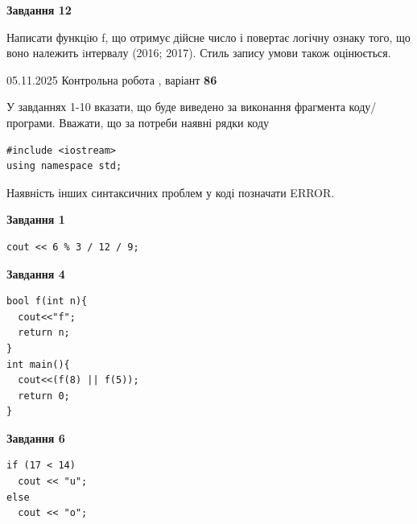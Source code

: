 \documentclass[12pt, ukrainian]{article}
\begin{document}
{\begin {large}
\begin{minipage}[t]{11.0cm}
\begin{center}
\textbf{Завдання 12}
\end{center}

Написати функцiю f, що отримує дійсне число і повертає логічну ознаку того, що воно належить iнтервалу (2016; 2017). Стиль запису умови також оцінюється.\par

\end{minipage}

\end {large}}
\newpage

{\Large{05.11.2025 Контрольна робота , варіант  \No \textbf { 86 }\par}}
{
\begin {large}
У завданнях 1-10 вказати, що буде виведено за виконання фрагмента коду/про\-гра\-ми.
Вважати, що за потреби наявні рядки коду
\begin{verbatim}
#include <iostream>
using namespace std;
\end{verbatim}
Наявність інших синтаксичних проблем у коді позначати ERROR.

\begin{minipage}[t]{7.0cm}

\begin{center}
\textbf{Завдання 1}
\end{center}
\vspace{-8mm}

\begin{verbatim}
cout << 6 % 3 / 12 / 9;
\end{verbatim}



\begin{center}
\textbf{Завдання 4}
\end{center}
\vspace{-8mm}

\begin{verbatim}
bool f(int n){
  cout<<"f";
  return n;
}
int main(){
  cout<<(f(8) || f(5));
  return 0;
}
\end{verbatim}



\begin{center}
\textbf{Завдання 6}
\end{center}
\vspace{-8mm}

\begin{verbatim}
if (17 < 14)
  cout << "u";
else
  cout << "o";
\end{verbatim}




\end{minipage}
\end{large}}
\end{document}
